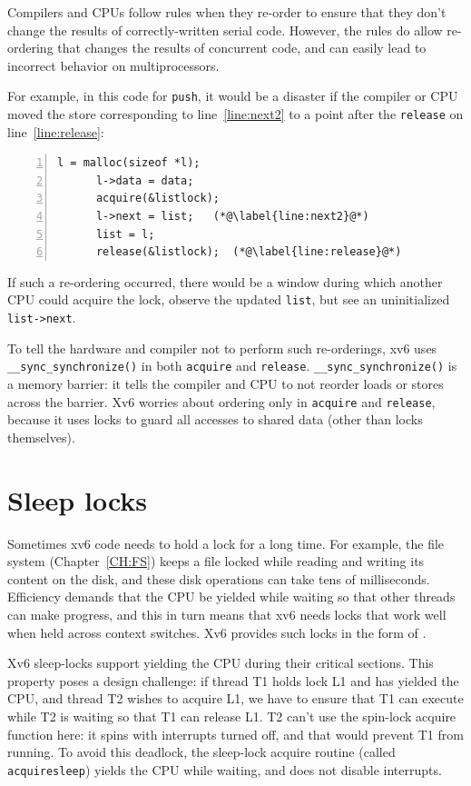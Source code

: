Compilers and CPUs follow rules when they re-order to
ensure that they don't change the results of correctly-written
serial code.
However, the rules do allow re-ordering that
changes the results of concurrent code,
and can easily lead to incorrect behavior on multiprocessors.

For example, in this code for
\lstinline{push},
it would be a disaster if the compiler or CPU moved the
store corresponding to
line~\ref{line:next2} to a point after the
\lstinline{release}
on line~\ref{line:release}:
\begin{lstlisting}[numbers=left,firstnumber=1]
      l = malloc(sizeof *l);
      l->data = data;
      acquire(&listlock);
      l->next = list;   (*@\label{line:next2}@*)
      list = l;      
      release(&listlock);  (*@\label{line:release}@*)
\end{lstlisting}
If such a re-ordering occurred, there would be a window during
which another CPU could acquire the lock,
observe the updated
\lstinline{list},
but see an uninitialized
\lstinline{list->next}.

To tell the hardware and compiler not to perform such re-orderings,
xv6 uses
\lstinline{__sync_synchronize()} 
in both
\lstinline{acquire}
and
\lstinline{release}.
\lstinline{__sync_synchronize()}
is a memory barrier:
it tells the compiler and CPU to not reorder loads or stores across the
barrier.
Xv6 worries about ordering only in
\lstinline{acquire}
and
\lstinline{release},
because it uses locks to guard all accesses to shared data (other than locks
themselves).
\section{Sleep locks}

Sometimes xv6 code needs to hold a lock for a long time. For example,
the file system (Chapter~\ref{CH:FS}) keeps a file locked while reading
and writing its content on the disk, and these disk operations can
take tens of milliseconds. Efficiency demands that the CPU be
yielded while waiting so that other threads can make
progress, and this in turn means that xv6 needs locks that 
work well when held across context switches.
Xv6 provides such locks in the form of
.

Xv6 sleep-locks support yielding the CPU during their critical
sections. This property poses a design challenge: if thread T1 holds
lock L1 and has yielded the CPU, and thread T2 wishes to acquire
L1, we have to ensure that T1 can execute while T2 is waiting so
that T1 can release L1. T2 can't use the spin-lock acquire
function here: it
spins with interrupts turned off, and that would prevent T1
from running. To avoid this deadlock, the sleep-lock acquire
routine
(called
\lstinline{acquiresleep})
yields the CPU while waiting, and does not disable
interrupts.

